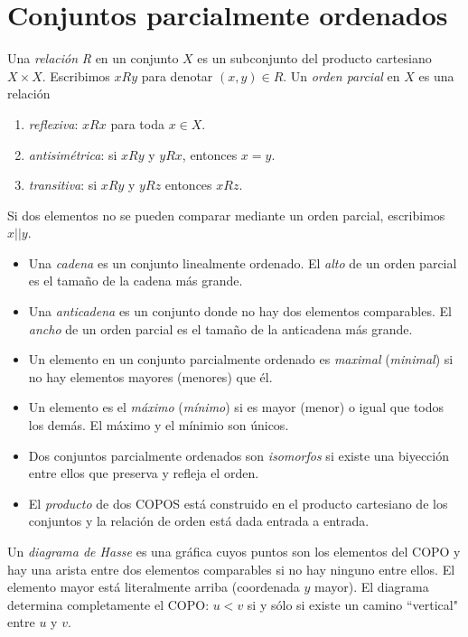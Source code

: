 \section{Conjuntos parcialmente ordenados}
\label{%
section-conjuntos-parcialmente-ordenados}
\begin{definition}
\label{definition-combi-013}
Una \emph{relación} \textit{R} en un conjunto
$X$ es un subconjunto del producto cartesiano
$X\times X$. Escribimos $xRy$ para denotar
$(x,y)\in R$. Un \emph{orden parcial} en $X$
es una relación
\begin{enumerate}
\item[] \emph{reflexiva}: $xRx$ para toda
$x\in X$.
\item[] \emph{antisimétrica}: si  $xRy$ y
$yRx$, entonces $x = y$.
\item[] \emph{transitiva}: si $xRy$ y $yRz$
entonces $xRz$.
\end{enumerate}
Si dos elementos no se pueden comparar
mediante un orden parcial, escribimos $x||y$.
\end{definition}
\begin{definition}
\label{definition-combi-014}\leavevmode
\begin{itemize}
\item   Una \emph{cadena} es un conjunto
linealmente ordenado. El \emph{alto} de un
orden parcial es el tamaño de la cadena más
grande.
\item Una \emph{anticadena} es un conjunto
donde no hay dos elementos comparables. El
\emph{ancho} de un orden parcial es el tamaño
de la anticadena más grande.
\item Un elemento en un conjunto parcialmente
ordenado es \emph{maximal} (\emph{minimal})
si no hay elementos mayores (menores) que él.
\item Un elemento es el \emph{máximo}
(\emph{mínimo}) si es mayor (menor) o igual
que todos los demás. El máximo y el mínimio
son únicos.
\item Dos conjuntos parcialmente ordenados
son \emph{isomorfos} si existe una biyección
entre ellos que preserva y refleja el orden.
\item El \emph{producto} de dos COPOS está
construido en el producto cartesiano de los
conjuntos y la relación de orden está dada
entrada a entrada.
\end{itemize}
\end{definition}
\begin{definition}
\label{definition-combi-015}
Un \emph{diagrama de Hasse} es una gráfica
cuyos puntos son los elementos del COPO y hay
una arista entre dos elementos comparables si
no hay ninguno entre ellos. El elemento mayor
está literalmente arriba (coordenada $y$
mayor). El diagrama determina completamente
el COPO: $u<v$ si y sólo si existe un camino
``vertical" entre $u$ y $v$.
\end{definition}
